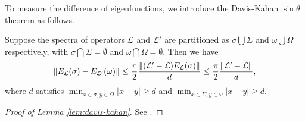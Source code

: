 To measure the difference of eigenfunctions, we introduce the Davis-Kahan $\sin\theta$ theorem as follows.
\begin{lemma}\label{lem:davis-kahan}
Suppose the spectra of operators ${\mathcal L}$ and ${\mathcal L}'$ are partitioned as $\sigma\bigcup\Sigma$ and $\omega\bigcup \Omega$ respectively, with $\sigma\bigcap \Sigma=\emptyset$ and $\omega\bigcap\Omega=\emptyset$. Then we have
\begin{equation}
\|E_{\mathcal L}(\sigma)-E_{{\mathcal L}'}(\omega)\|\leq \frac{\pi}{2}\frac{\|({\mathcal L}'-{\mathcal L})E_{\mathcal L}(\sigma)\|}{d}\leq \frac{\pi}{2}\frac{\|{\mathcal L}'-{\mathcal L}\|}{d},
\end{equation}
where $d$ satisfies $\min_{x\in\sigma,y\in\Omega}|x-y|\geq d$ and $\min_{x\in\Sigma,y\in\omega}|x-y|\geq d$.
\end{lemma}
\begin{proof}[Proof of Lemma \ref{lem:davis-kahan}] 
See \cite{seelmann2014notes}.
\end{proof}


